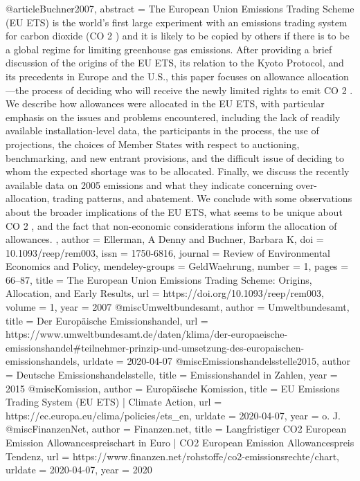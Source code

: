 @article{Buchner2007,
abstract = {The European Union Emissions Trading Scheme (EU ETS) is the world's first large experiment with an emissions trading system for carbon dioxide (CO 2 ) and it is likely to be copied by others if there is to be a global regime for limiting greenhouse gas emissions. After providing a brief discussion of the origins of the EU ETS, its relation to the Kyoto Protocol, and its precedents in Europe and the U.S., this paper focuses on allowance allocation—the process of deciding who will receive the newly limited rights to emit CO 2 . We describe how allowances were allocated in the EU ETS, with particular emphasis on the issues and problems encountered, including the lack of readily available installation-level data, the participants in the process, the use of projections, the choices of Member States with respect to auctioning, benchmarking, and new entrant provisions, and the difficult issue of deciding to whom the expected shortage was to be allocated. Finally, we discuss the recently available data on 2005 emissions and what they indicate concerning over-allocation, trading patterns, and abatement. We conclude with some observations about the broader implications of the EU ETS, what seems to be unique about CO 2 , and the fact that non-economic considerations inform the allocation of allowances. },
author = {Ellerman, A Denny and Buchner, Barbara K},
doi = {10.1093/reep/rem003},
issn = {1750-6816},
journal = {Review of Environmental Economics and Policy},
mendeley-groups = {GeldWaehrung},
number = {1},
pages = {66--87},
title = {{The European Union Emissions Trading Scheme: Origins, Allocation, and Early Results}},
url = {https://doi.org/10.1093/reep/rem003},
volume = {1},
year = {2007}
}
@misc{Umweltbundesamt,
author = {Umweltbundesamt},
title = {{Der Europ{\"{a}}ische Emissionshandel}},
url = {https://www.umweltbundesamt.de/daten/klima/der-europaeische-emissionshandel{\#}teilnehmer-prinzip-und-umsetzung-des-europaischen-emissionshandels},
urldate = {2020-04-07}
}
@misc{Emissionshandelsstelle2015,
author = {{Deutsche Emissionshandelsstelle}},
title = {{Emissionshandel in Zahlen}},
year = {2015}
}
@misc{Komission,
author = {{Europ{\"{a}}ische Komission}},
title = {{EU Emissions Trading System (EU ETS) | Climate Action}},
url = {https://ec.europa.eu/clima/policies/ets{\_}en},
urldate = {2020-04-07},
year = {{o. J.}}
}
@misc{FinanzenNet,
author = {Finanzen.net},
title = {{Langfristiger CO2 European Emission Allowancespreischart in Euro | CO2 European Emission Allowancespreis Tendenz}},
url = {https://www.finanzen.net/rohstoffe/co2-emissionsrechte/chart},
urldate = {2020-04-07},
year = {2020}
}
